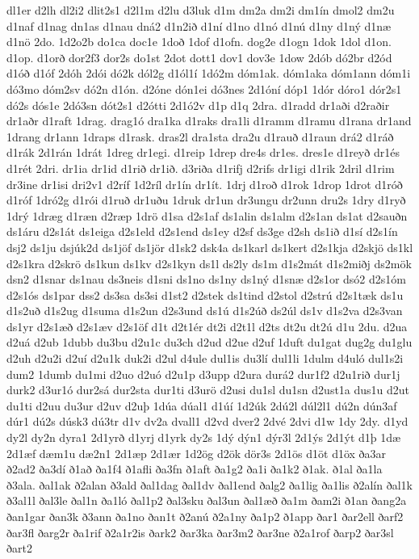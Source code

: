 {dl1er
d2lh
dl2i2
dlit2s1
d2l1m
d2lu
d3luk
d1m
dm2a
dm2i
dm1ín
dmol2
dm2u
d1naf
d1nag
dn1as
d1nau
dná2
d1n2ið
d1ní
d1no
d1nó
d1nú
d1ny
d1ný
d1næ
d1nö
2do.
1d2o2b
do1ca
doc1e
1doð
1dof
d1ofn.
dog2e
d1ogn
1dok
1dol
d1on.
d1op.
d1orð
dor2f3
dor2s
do1st
2dot
dott1
dov1
dov3e
1dow
2dób
dó2br
d2ód
d1óð
d1óf
2dóh
2dói
dó2k
dól2g
d1ól1í
1dó2m
dóm1ak.
dóm1aka
dóm1ann
dóm1i
dó3mo
dóm2sv
dó2n
d1ón.
d2óne
dón1ei
dó3nes
2d1óní
dóp1
1dór
dóro1
dór2s1
dó2s
dós1e
2dó3sn
dót2s1
d2ótti
2d1ó2v
d1p
d1q
2dra.
d1radd
dr1aði
d2raðir
dr1aðr
d1raft
1drag.
drag1ó
dra1ka
d1raks
dra1li
d1ramm
d1ramu
d1rana
dr1and
1drang
dr1ann
1draps
d1rask.
dras2l
dra1sta
dra2u
d1rauð
d1raun
drá2
d1ráð
d1rák
2d1rán
1drát
1dreg
dr1egi.
d1reip
1drep
dre4s
dr1es.
dres1e
d1reyð
dr1és
d1rét
2dri.
dr1ia
dr1id
d1rið
dr1ið.
d3riða
d1rifj
d2rifs
dr1igi
d1rik
2dril
d1rim
dr3ine
dr1isi
dri2v1
d2ríf
1d2ríl
dr1ín
dr1ít.
1drj
d1roð
d1rok
1drop
1drot
d1róð
d1róf
1dró2g
d1rói
d1ruð
dr1uðu
1druk
dr1un
dr3ungu
dr2unn
dru2s
1dry
d1ryð
1drý
1dræg
d1ræn
d2ræp
1drö
d1sa
d2s1af
ds1alin
ds1alm
d2s1an
ds1at
d2sauðn
ds1áru
d2s1át
ds1eiga
d2s1eld
d2s1end
ds1ey
d2sf
ds3ge
d2sh
ds1ið
d1sí
d2s1ín
dsj2
ds1ju
dsjúk2d
ds1jöf
ds1jör
d1sk2
dsk4a
ds1karl
ds1kert
d2s1kja
d2skjö
ds1kl
d2s1kra
d2skrö
ds1kun
ds1kv
d2s1kyn
ds1l
ds2ly
ds1m
d1s2mát
d1s2miðj
ds2mök
dsn2
d1snar
ds1nau
ds3neis
d1sni
ds1no
ds1ny
ds1ný
d1snæ
d2s1or
dsó2
d2s1óm
d2s1ós
ds1par
dss2
ds3sa
ds3si
d1st2
d2stek
ds1tind
d2stol
d2strú
d2s1tæk
ds1u
d1s2uð
d1s2ug
d1suma
d1s2un
d2s3und
ds1ú
d1s2úð
ds2úl
ds1v
d1s2va
d2s3van
ds1yr
d2s1æð
d2s1æv
d2s1öf
d1t
d2t1ér
dt2i
d2t1l
d2ts
dt2u
dt2ú
d1u
2du.
d2ua
d2uá
d2ub
1dubb
du3bu
d2u1c
du3ch
d2ud
d2ue
d2uf
1duft
du1gat
dug2g
du1glu
d2uh
d2u2i
d2uí
d2u1k
duk2i
d2ul
d4ule
dul1is
du3lí
dul1li
1dulm
d4uló
dul1s2i
dum2
1dumb
du1mi
d2uo
d2uó
d2u1p
d3upp
d2ura
durá2
dur1f2
d2u1rið
dur1j
durk2
d3ur1ó
dur2sá
dur2sta
dur1ti
d3urö
d2usi
du1sl
du1sn
d2ust1a
dus1u
d2ut
du1ti
d2uu
du3ur
d2uv
d2uþ
1dúa
dúal1
d1úí
1d2úk
2dú2l
dúl2l1
dú2n
dún3af
dúr1
dú2s
dúsk3
dú3tr
d1v
dv2a
dvall1
d2vd
dver2
2dvé
2dvi
d1w
1dy
2dy.
d1yd
dy2l
dy2n
dyra1
2d1yrð
d1yrj
d1yrk
dy2s
1dý
dýn1
dýr3l
2d1ýs
2d1ýt
d1þ
1dæ
2d1æf
dæm1u
dæ2n1
2d1æp
2d1ær
1d2ög
d2ök
dör3s
2d1ös
d1öt
d1öx
ða3ar
ð2ad2
ða3dí
ð1að
ða1f4
ð1afli
ða3fn
ð1aft
ða1g2
ða1i
ða1k2
ð1ak.
ð1al
ða1la
ð3ala.
ðal1ak
ð2alan
ð3ald
ðal1dag
ðal1dv
ðal1end
ðalg2
ða1lig
ða1lis
ð2alín
ðal1k
ð3al1l
ðal3le
ðal1n
ða1ló
ðal1p2
ðal3sku
ðal3un
ðal1æð
ða1m
ðam2i
ð1an
ðang2a
ðan1gar
ðan3k
ð3ann
ða1no
ðan1t
ð2anú
ð2a1ny
ða1p2
ð1app
ðar1
ðar2ell
ðarf2
ðar3fl
ðarg2r
ða1rif
ð2a1r2is
ðark2
ðar3ka
ðar3m2
ðar3ne
ð2a1rof
ðarp2
ðar3sl
ðart2
}

